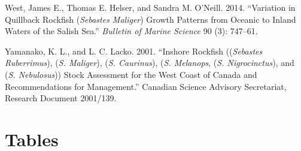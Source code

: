 \documentclass[11pt,
  english,
  a4paper,
]{article}
\begin{document}
\leavevmode\hypertarget{ref-Westetal_2014}{}%
West, James E., Thomas E. Helser, and Sandra M. O'Neill. 2014. ``Variation in Quillback Rockfish (\emph{Sebastes Maliger}) Growth Patterns from Oceanic to Inland Waters of the Salish Sea.'' \emph{Bulletin of Marine Science} 90 (3): 747--61.

\leavevmode\hypertarget{ref-YamanakaandLacko_rockfish_2001}{}%
Yamanako, K. L., and L. C. Lacko. 2001. ``Inshore Rockfish ((\emph{Sebastes Ruberrimus}), (\emph{S. Maliger}), (\emph{S. Caurinus}), (\emph{S. Melanops}, (\emph{S. Nigrocinctus}), and (\emph{S. Nebulosus})) Stock Assessment for the West Coast of Canada and Recommendations for Management.'' Canadian Science Advisory Secretariat, Research Document 2001/139.

\leavevmode\tagmcend\tagstructend

\clearpage


\hypertarget{tables}{%
\section{Tables}\label{tables}}

\leavevmode\tagmcend\tagstructend



\newpage

\begingroup\fontsize{10}{12}\selectfont
\begingroup\fontsize{10}{12}\selectfont
\end{document}

